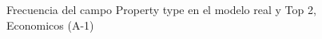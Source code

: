 \begin{figure}[H]
    \centering
    
    \caption{Frecuencia del campo Property type en el modelo real y Top 2, Economicos (A-1)}
    \label{frecuency-Property Type-top2}
\end{figure}
